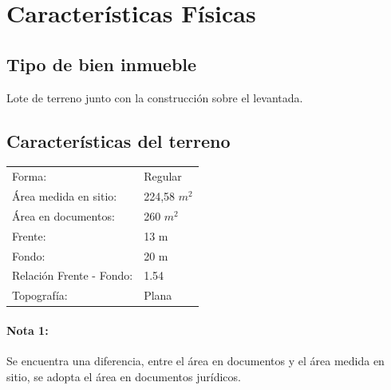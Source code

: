 \documentclass[12pt,a4paper,twoside]{article}
\begin{document}
{%
%

\section{Características Físicas}

\subsection{Tipo de bien inmueble}

Lote de terreno junto con la construcción sobre el levantada.

\subsection{Características del terreno}


\begin{tabular}{ l l }
   
   
    Forma: & Regular\\
   Área medida en sitio: & 224,58 $m^{2}$\\
   Área en documentos: & 260 $m^{2}$\\
   Frente: & 13 m\\
  Fondo: & 20 m\\
   Relación Frente - Fondo: & 1.54\\
   Topografía: & Plana\\
   
\end{tabular}

\paragraph{Nota 1:} Se encuentra una diferencia, entre el área en documentos y el área medida en sitio, se adopta el área en documentos jurídicos.


}
\end{document}
